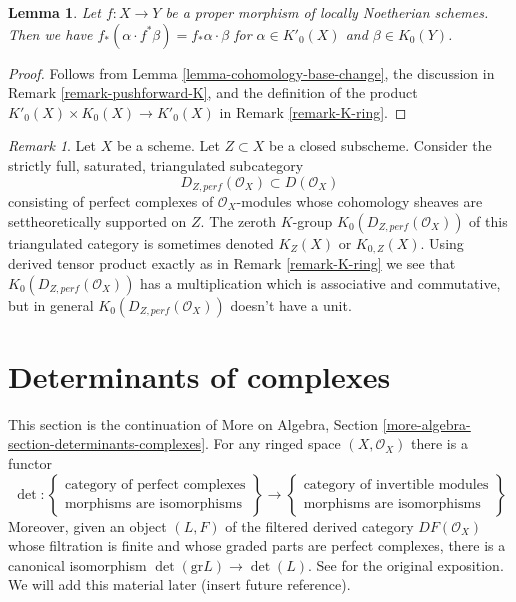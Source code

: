 \documentclass{stacks-project}
\theoremstyle{plain}
\newtheorem{lemma}[subsection]{Lemma}
\theoremstyle{definition}
\theoremstyle{remark}
\newtheorem{remark}[subsection]{Remark}
\numberwithin{equation}{subsection}
\begin{document}
\begin{lemma}
\label{lemma-projection-formula}
Let $f : X \to Y$ be a proper morphism of locally Noetherian schemes.
Then we have $f_*(\alpha \cdot f^*\beta) = f_*\alpha \cdot \beta$
for $\alpha \in K'_0(X)$ and $\beta \in K_0(Y)$.
\end{lemma}

\begin{proof}
Follows from Lemma \ref{lemma-cohomology-base-change}, the discussion in
Remark \ref{remark-pushforward-K}, and the definition of the product
$K'_0(X) \times K_0(X) \to K'_0(X)$ in Remark \ref{remark-K-ring}.
\end{proof}

\begin{remark}
\label{remark-perf-Z}
Let $X$ be a scheme. Let $Z \subset X$ be a closed subscheme. Consider the
strictly full, saturated, triangulated subcategory
$$
D_{Z, perf}(\mathcal{O}_X) \subset D(\mathcal{O}_X)
$$
consisting of perfect complexes of $\mathcal{O}_X$-modules
whose cohomology sheaves are settheoretically supported on $Z$.
The zeroth $K$-group $K_0(D_{Z, perf}(\mathcal{O}_X))$
of this triangulated category is sometimes denoted
$K_Z(X)$ or $K_{0, Z}(X)$. Using derived tensor product exactly
as in Remark \ref{remark-K-ring} we see that $K_0(D_{Z, perf}(\mathcal{O}_X))$
has a multiplication which is associative and commutative,
but in general $K_0(D_{Z, perf}(\mathcal{O}_X))$ doesn't have a unit.
\end{remark}













\section{Determinants of complexes}
\label{section-det-two-terms}

\noindent
This section is the continuation of
More on Algebra, Section \ref{more-algebra-section-determinants-complexes}.
For any ringed space $(X, \mathcal{O}_X)$ there is a functor
$$
\det :
\left\{
\begin{matrix}
\text{category of perfect complexes} \\
\text{morphisms are isomorphisms}
\end{matrix}
\right\}
\longrightarrow
\left\{
\begin{matrix}
\text{category of invertible modules} \\
\text{morphisms are isomorphisms}
\end{matrix}
\right\}
$$
Moreover, given an object $(L, F)$ of the filtered derived category
$DF(\mathcal{O}_X)$ whose filtration is finite and whose graded parts
are perfect complexes, there is a canonical isomorphism
$\det(\text{gr}L) \to \det(L)$. See \cite{determinant} for the
original exposition. We will add this material later (insert future reference).
\end{document}
